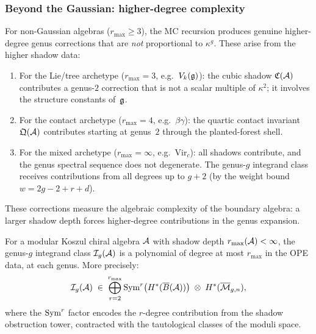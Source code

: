\subsubsection{Beyond the Gaussian: higher-degree complexity}
\label{subsubsec:thqg-VII-beyond-gaussian}

\begin{remark}
\label{rem:thqg-VII-grav-corrections}
For non-Gaussian algebras ($r_{\max} \geq 3$), the MC recursion
produces genuine higher-degree genus corrections that are
\emph{not} proportional to $\kappa^g$. These arise from the
higher shadow data:
\begin{enumerate}[label=(\alph*)]
\item For the Lie/tree archetype ($r_{\max} = 3$,
 e.g.\ $V_k(\mathfrak{g})$): the cubic shadow $\mathfrak{C}(\mathcal{A})$
 contributes a genus-$2$ correction that is not a scalar
 multiple of $\kappa^2$; it involves the structure constants
 of~$\mathfrak{g}$.
\item For the contact archetype ($r_{\max} = 4$,
 e.g.\ $\beta\gamma$): the quartic contact invariant
 $\mathfrak{Q}(\mathcal{A})$ contributes starting at genus~$2$
 through the planted-forest shell.
\item For the mixed archetype ($r_{\max} = \infty$,
 e.g.\ $\mathrm{Vir}_c$): all shadows contribute, and
 the genus spectral sequence does not degenerate. The
 genus-$g$ integrand class receives contributions
 from all degrees up to $g + 2$ (by the weight bound
 $w = 2g - 2 + r + d$).
\end{enumerate}
These corrections measure the algebraic complexity of the boundary
algebra: a larger shadow depth forces higher-degree contributions in
the genus expansion.
\end{remark}

\begin{proposition}
\label{prop:thqg-VII-complexity-bounds}
For a modular Koszul chiral algebra $\mathcal{A}$ with shadow depth
$r_{\max}(\mathcal{A}) < \infty$, the genus-$g$ integrand class
$\mathcal{I}_g(\mathcal{A})$ is a polynomial of degree
at most $r_{\max}$ in the OPE data, at each genus. More
precisely:
\begin{equation}\label{eq:thqg-VII-complexity-bound}
\mathcal{I}_g(\mathcal{A})
\;\in\;
\bigoplus_{r=2}^{r_{\max}}
\operatorname{Sym}^r\bigl(H^*(\overline{B}(\mathcal{A}))\bigr)
\;\otimes\;
H^*(\overline{\mathcal{M}}_{g,n}),
\end{equation}
where the $\operatorname{Sym}^r$ factor encodes the $r$-degree contribution
from the shadow obstruction tower, contracted with the tautological classes
of the moduli space.
\end{proposition}

